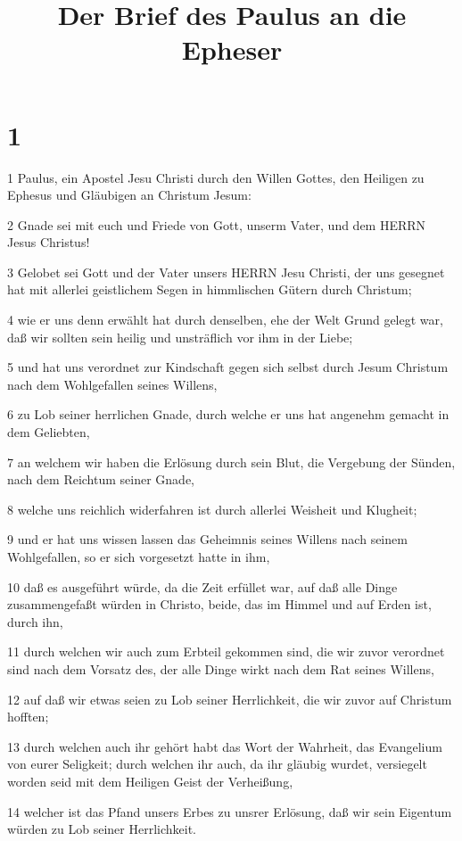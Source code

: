 

\title{Der Brief des Paulus an die Epheser}


\chapter{1}

\par 1 Paulus, ein Apostel Jesu Christi durch den Willen Gottes, den Heiligen zu Ephesus und Gläubigen an Christum Jesum:
\par 2 Gnade sei mit euch und Friede von Gott, unserm Vater, und dem HERRN Jesus Christus!
\par 3 Gelobet sei Gott und der Vater unsers HERRN Jesu Christi, der uns gesegnet hat mit allerlei geistlichem Segen in himmlischen Gütern durch Christum;
\par 4 wie er uns denn erwählt hat durch denselben, ehe der Welt Grund gelegt war, daß wir sollten sein heilig und unsträflich vor ihm in der Liebe;
\par 5 und hat uns verordnet zur Kindschaft gegen sich selbst durch Jesum Christum nach dem Wohlgefallen seines Willens,
\par 6 zu Lob seiner herrlichen Gnade, durch welche er uns hat angenehm gemacht in dem Geliebten,
\par 7 an welchem wir haben die Erlösung durch sein Blut, die Vergebung der Sünden, nach dem Reichtum seiner Gnade,
\par 8 welche uns reichlich widerfahren ist durch allerlei Weisheit und Klugheit;
\par 9 und er hat uns wissen lassen das Geheimnis seines Willens nach seinem Wohlgefallen, so er sich vorgesetzt hatte in ihm,
\par 10 daß es ausgeführt würde, da die Zeit erfüllet war, auf daß alle Dinge zusammengefaßt würden in Christo, beide, das im Himmel und auf Erden ist, durch ihn,
\par 11 durch welchen wir auch zum Erbteil gekommen sind, die wir zuvor verordnet sind nach dem Vorsatz des, der alle Dinge wirkt nach dem Rat seines Willens,
\par 12 auf daß wir etwas seien zu Lob seiner Herrlichkeit, die wir zuvor auf Christum hofften;
\par 13 durch welchen auch ihr gehört habt das Wort der Wahrheit, das Evangelium von eurer Seligkeit; durch welchen ihr auch, da ihr gläubig wurdet, versiegelt worden seid mit dem Heiligen Geist der Verheißung,
\par 14 welcher ist das Pfand unsers Erbes zu unsrer Erlösung, daß wir sein Eigentum würden zu Lob seiner Herrlichkeit.
